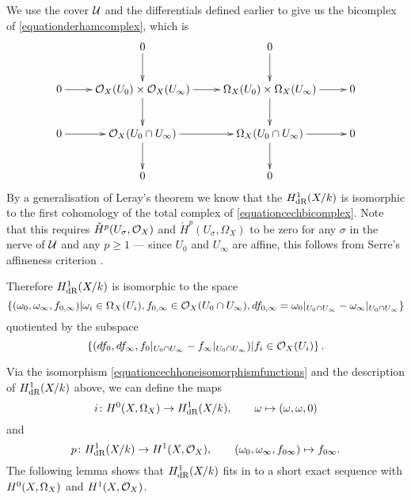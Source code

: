 We use the cover $\cal U$ and the \cech differentials defined earlier to give us the \cech bicomplex of \eqref{equationderhamcomplex}, which is
    \begin{equation}\label{equationcechbicomplex}
    \xymatrix{ & 0 \ar[d] & 0 \ar[d] & \\
    0 \ar[r] & \cO_X(U_0) \times \cO_X(U_\infty) \ar[d] \ar[r] & \Omega_X(U_0) \times \Omega_X(U_\infty) \ar[d] \ar[r] & 0 \\
    0 \ar[r] & \cO_X(U_0\cap U_\infty) \ar[d] \ar[r] & \Omega_X(U_0 \cap U_\infty) \ar[r] \ar[d] & 0 \\
    & 0 & 0 &}
    \end{equation}
By a generalisation of Leray's theorem \cite[Cor.\ 12.4.7]{EGA0III} we know that the $H_{\text {dR}}^1(X/k)$ is isomorphic to the first cohomology of the total complex of \eqref{equationcechbicomplex}.
Note that this requires ${\check H}^p(U_\sigma, {\cal O}_X)$ and ${\check H}^p(U_\sigma, \Omega_X)$ to be zero for any $\sigma$ in the nerve of ${\mathcal U}$ and any $p \geq 1$ ---
since $U_0$ and $U_\infty$ are affine, this follows from Serre's affineness criterion \cite[Thm.\ 5.2.23]{liu}.


Therefore $H_{\text {dR}}^1(X/k)$ is isomorphic to the space
    \begin{equation}\label{equationderhamspace}
    \left\{(\omega_0, \omega_\infty, f_{0,\infty}) | \omega_i\in \Omega_X(U_i), f_{0,\infty}\in {\cal O}_X(U_0 \cap U_\infty), df_{0,\infty} = \omega_0|_{U_0\cap U_\infty} - \omega_\infty|_{U_0\cap U_\infty} \right\}
    \end{equation}
quotiented by the subspace
    \begin{equation}\label{equationderhamquotient}
    \left\{  (df_0, df_\infty, f_0|_{U_0\cap U_\infty} -f_\infty|_{U_0\cap U_\infty} )|f_i \in {\cal O}_X(U_i)\right\}.
    \end{equation}

Via the isomorphism \eqref{equationcechhoneisomorphismfunctions} and the description of $H_{\text {dR}}^1(X/k)$ above, we can define the maps
    \begin{equation}\label{equationinjectionofhzerointoderham} 
    i \colon {H^0(X,\Omega_X)} \rightarrow H_{\text {dR}}^1(X/k), \qquad \omega \mapsto (\omega, \omega, 0)
    \end{equation}
and 
    \begin{equation}\label{equationsurjectionofderhamontohone}
    p \colon H_{\text {dR}}^1(X/k) \rightarrow H^1(X,\mathcal{O}_X), \qquad (\omega_0, \omega_\infty, f_{0 \infty}) \mapsto f_{0 \infty}.
    \end{equation}
The following lemma shows that $H_{\text {dR}}^1(X/k)$ fits in to a short exact sequence with ${H^0(X,\Omega_X)}$ and $H^1(X,\mathcal{O}_X)$.
    

